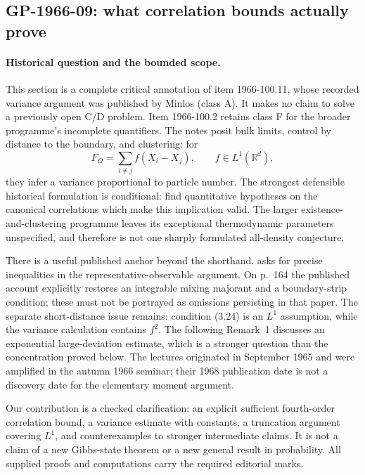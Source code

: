 \subsection{GP-1966-09: what correlation bounds actually prove}
\label{dev:canonical}

\paragraph{Historical question and the bounded scope.}
This section is a complete critical annotation of item 1966-100.11, whose recorded variance argument was published by Minlos (class A). It makes no claim to solve a previously open C/D problem. Item 1966-100.2 retains class F for the broader programme’s incomplete quantifiers. The notes posit bulk limits, control by distance to the boundary, and clustering; for
\[
 F_\Omega=\sum_{i\ne j}f(X_i-X_j),\qquad f\in L^1(\mathbb R^d),
\]
they infer a variance proportional to particle number. The strongest defensible historical formulation is conditional: find quantitative hypotheses on the canonical correlations which make this implication valid. The larger existence-and-clustering programme leaves its exceptional thermodynamic parameters unspecified, and therefore is not one sharply formulated all-density conjecture.

There is a useful published anchor beyond the shorthand. \citet[Lecture III, \S4, pp.~162--164, especially Problem~3]{minlos1968lectures} asks for precise inequalities in the representative-observable argument. On p.~164 the published account explicitly restores an integrable mixing majorant and a boundary-strip condition; these must not be portrayed as omissions persisting in that paper. The separate short-distance issue remains: condition (3.24) is an \(L^1\) assumption, while the variance calculation contains \(f^2\). The following Remark~1 discusses an exponential large-deviation estimate, which is a stronger question than the concentration proved below. The lectures originated in September 1965 and were amplified in the autumn 1966 seminar; their 1968 publication date is not a discovery date for the elementary moment argument.

Our contribution is a checked clarification: an explicit sufficient fourth-order correlation bound, a variance estimate with constants, a truncation argument covering \(L^1\), and counterexamples to stronger intermediate claims. It is not a claim of a new Gibbs-state theorem or a new general result in probability. All supplied proofs and computations carry the required editorial marks.

